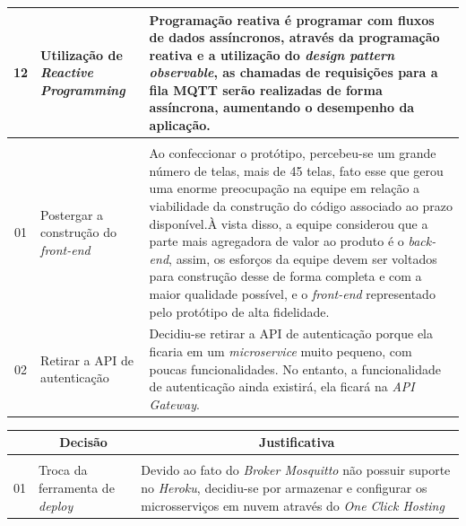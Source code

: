 \begin{apendicesenv}
\begin{table}[H]
\begin{adjustbox}{max width = \textwidth}
\begin{tabular}{|c|p{5cm}|p{10cm}|}
            \hline
            12 & Utilização de \textit{Reactive Programming} & Programação reativa é programar com fluxos de dados assíncronos, através da programação reativa e a utilização do \textit{design pattern observable}, as chamadas de requisições para a fila MQTT serão realizadas de forma assíncrona, aumentando o desempenho da aplicação. \\ 
            \hline
             \rowcolor[HTML]{1D3557}\multicolumn{3}{|c|}{\textbf{\color{white}Ponto de Controle 2}} \\
             
             \hline
            01 & Postergar a construção do \textit{front-end} & Ao confeccionar o protótipo, percebeu-se um grande número de telas, mais de 45 telas, fato esse que gerou uma enorme preocupação na equipe em relação a viabilidade da construção do código associado ao prazo disponível.À vista disso, a equipe considerou que a parte mais agregadora de valor ao produto é o \textit{back-end}, assim, os esforços da equipe devem ser voltados para construção desse de forma completa e com a maior qualidade possível, e o \textit{front-end} representado pelo protótipo de alta fidelidade. \\ 
            \hline 02 & Retirar a API de autenticação & Decidiu-se retirar a API de autenticação porque ela ficaria em um \textit{microservice} muito pequeno, com poucas funcionalidades. No entanto, a funcionalidade de autenticação ainda existirá, ela ficará na \textit{API Gateway}. \\
            \hline
        \end{tabular}
    \end{adjustbox}
\end{table}

\begin{table}[H]
    \centering
    \begin{adjustbox}{max width = \textwidth}
        \begin{tabular}{|c|p{5cm}|p{10cm}|}
            \hline
            \rowcolor[HTML]{A8DADC}
            \multicolumn{1}{|c}{\textbf{\#}} &
            \multicolumn{1}{|c}{\textbf{Decisão}} & \multicolumn{1}{|c|}{\textbf{Justificativa}} \\ 
            \hline
             \rowcolor[HTML]{1D3557}\multicolumn{3}{|c|}{\textbf{\color{white}Ponto de Controle 3}} \\
             \hline
            01 & Troca da ferramenta de \textit{deploy}  & Devido ao fato do \textit{Broker Mosquitto} não possuir suporte no \textit{Heroku}, decidiu-se por armazenar e configurar os microsserviços em nuvem através do \textit{One Click Hosting}\\ 
            \hline
        \end{tabular}
    \end{adjustbox}
\end{table}


\end{apendicesenv}
